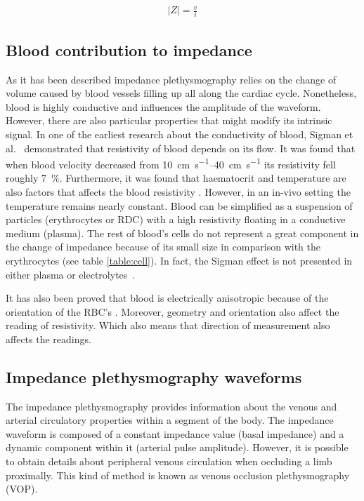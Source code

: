  \begin{align}
 	\label{eq:|Z|}
 	\left| Z \right| = \frac{v}{i}
 \end{align}


\subsection{Blood contribution to impedance} %
As it has been described impedance plethysmography relies on the change of volume caused by blood vessels filling up all along the cardiac cycle. Nonetheless, blood is highly conductive and influences the amplitude of the waveform. However, there are also particular properties that might modify its intrinsic signal. In one of the earliest research about the conductivity of blood, Sigman et al.~\cite{sigman1937effect} demonstrated that resistivity of blood depends on its flow. It was found that when blood velocity decreased from \SIrange{10}{40}{\centi\meter\per\second} its resistivity fell roughly \SI{7}{\percent}. Furthermore, it was found that haematocrit and temperature are also factors that affects the blood resistivity \cite{yamakoshi1980noninvasive}. However, in an in-vivo setting the temperature remains nearly constant. Blood can be simplified as a suspension of particles (erythrocytes or RDC) with a high resistivity floating in a conductive medium (plasma). The rest of blood’s cells do not represent a great component in the change of impedance because of its small size in comparison with the erythrocytes (see table \ref{table:cell}). In fact, the Sigman effect is not presented in either plasma or electrolytes~\cite{tremper1990principles}.  

It has also been proved that blood is electrically anisotropic because of the orientation of the RBC’s \cite{Visser1992Electric}. Moreover, geometry and orientation also affect the reading of resistivity. Which also means that direction of measurement also affects the readings. 

\subsection{Impedance plethysmography waveforms}
\label{section iPG waveforms}
The impedance plethysmography provides information about the venous and arterial circulatory properties within a segment of the body. The impedance waveform is composed of a constant impedance value (basal impedance) and a dynamic component within it (arterial pulse amplitude). However, it is possible to obtain details about peripheral venous circulation when occluding a limb proximally. This kind of method is known as venous occlusion plethysmography (VOP).

